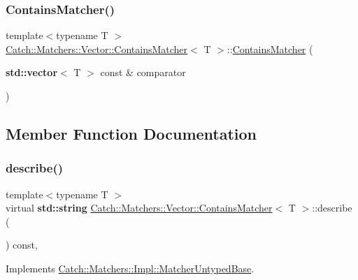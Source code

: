 \subsubsection{\texorpdfstring{Contains\+Matcher()}{ContainsMatcher()}}
{\footnotesize\ttfamily template$<$typename T $>$ \\
\hyperlink{struct_catch_1_1_matchers_1_1_vector_1_1_contains_matcher}{Catch\+::\+Matchers\+::\+Vector\+::\+Contains\+Matcher}$<$ T $>$\+::\hyperlink{struct_catch_1_1_matchers_1_1_vector_1_1_contains_matcher}{Contains\+Matcher} (\begin{DoxyParamCaption}\item[{\textbf{ std\+::vector}$<$ T $>$ const \&}]{comparator }\end{DoxyParamCaption})\hspace{0.3cm}{\ttfamily [inline]}}



\subsection{Member Function Documentation}
\mbox{\label{struct_catch_1_1_matchers_1_1_vector_1_1_contains_matcher_add1a31f049cec89f980424ecdb7027ac}} 
\subsubsection{\texorpdfstring{describe()}{describe()}}
{\footnotesize\ttfamily template$<$typename T $>$ \\
virtual \textbf{ std\+::string} \hyperlink{struct_catch_1_1_matchers_1_1_vector_1_1_contains_matcher}{Catch\+::\+Matchers\+::\+Vector\+::\+Contains\+Matcher}$<$ T $>$\+::describe (\begin{DoxyParamCaption}{ }\end{DoxyParamCaption}) const\hspace{0.3cm}{\ttfamily [inline]}, {\ttfamily [virtual]}}



Implements \hyperlink{class_catch_1_1_matchers_1_1_impl_1_1_matcher_untyped_base_a91d3a907dbfcbb596077df24f6e11fe2}{Catch\+::\+Matchers\+::\+Impl\+::\+Matcher\+Untyped\+Base}.

